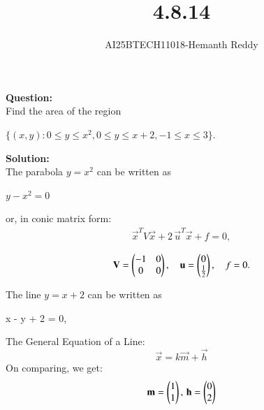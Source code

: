 \documentclass[journal]{IEEEtran}
\begin{document}

\vspace{3cm}

\title{4.8.14}
\author{AI25BTECH11018-Hemanth Reddy}
 \maketitle
{\let\newpage\relax\maketitle}

\renewcommand{\thefigure}{\theenumi}
\renewcommand{\thetable}{\theenumi}
\setlength{\intextsep}{10pt} %


\renewcommand{\thetable}{\theenumi}

\textbf{Question:}\\

Find the area of the region


$
\{(x,y) : 0 \leq y \leq x^2, 0 \leq y \leq x+2, -1 \leq x \leq 3\}.
$

\textbf{Solution:}\\

The parabola $ y = x^2 $ can be written as\\
\begin{center}
    $y - x^2 = 0$
\end{center}


or, in conic matrix form:
\begin{align}
    \vec{x}^T V \vec{x} + 2\, \vec{u}^T \vec{x} + f = 0,
\end{align}



\begin{align}
    \mathbf{V} = \begin{pmatrix}
-1 & 0 \\
0 & 0
\end{pmatrix}, \quad
\mathbf{u} = \begin{pmatrix}
0 \\ \frac{1}{2}
\end{pmatrix}, \quad
f = 0.
\end{align}



The line \( y = x + 2 \) can be written as\\
\begin{center}
    x - y + 2 = 0,
\end{center}


The General Equation of a Line:
\begin{equation}
    \vec{x} = k\vec{m} + \vec{h}
\end{equation}
On comparing, we get:
\begin{equation}
    \mathbf{m} = \begin{pmatrix}1 \\ 1\end{pmatrix}, \, \mathbf{h} = \begin{pmatrix}0 \\ 2\end{pmatrix}
\end{equation}
\end{document}
